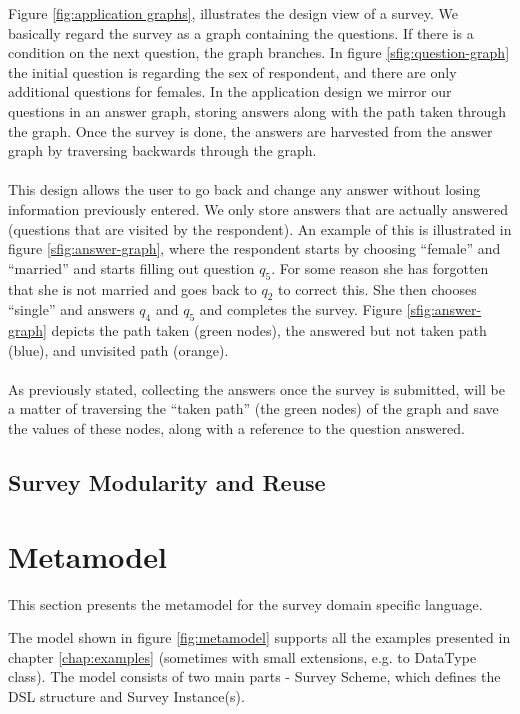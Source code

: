 Figure \ref{fig:application graphs}, illustrates the design view of a survey. We basically regard the survey as a graph containing the questions. If there is a condition on the next question, the graph branches. In figure \ref{sfig:question-graph} the initial question is regarding the sex of respondent, and there are only additional questions for females. In the application design we mirror our questions in an answer graph, storing answers along with the path taken through the graph. Once the survey is done, the answers are harvested from the answer graph by traversing backwards through the graph. \\\\
This design allows the user to go back and change any answer without losing information previously entered. We only store answers that are actually answered (questions that are visited by the respondent). An example of this is illustrated in figure \ref{sfig:answer-graph}, where the respondent starts by choosing ``female'' and ``married'' and starts filling out question $q_5$. For some reason she has forgotten that she is not married and goes back to $q_2$ to correct this. She then chooses ``single'' and answers $q_4$ and $q_5$ and completes the survey. Figure \ref{sfig:answer-graph} depicts the path taken (green nodes), the answered but not taken path (blue), and unvisited path (orange).\\\\
As previously stated, collecting the answers once the survey is submitted, will be a matter of traversing the ``taken path'' (the green nodes) of the graph and save the values of these nodes, along with a reference to the question answered.
\subsection{Survey Modularity and Reuse}
\label{subsec:modularityandreuse}

\section{Metamodel}
\label{sec:metamodel}
This section presents the metamodel for the survey domain specific language.  

The model shown in figure \ref{fig:metamodel} supports all the examples presented in chapter \ref{chap:examples} (sometimes with small extensions, e.g. to DataType class).
The model consists of two main parts - Survey Scheme, which defines the DSL structure and Survey Instance(s).

